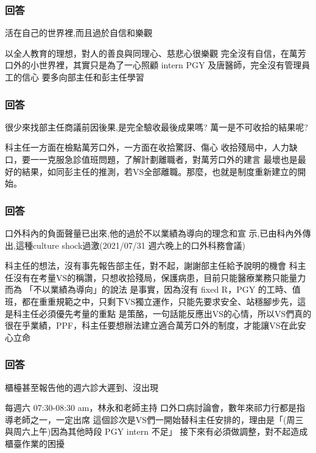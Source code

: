 \documentclass[t,24pt,aspectratio=169]{beamer}
\begin{document}



\begin{frame}[hoved]
\frametitle{回答}
活在自己的世界裡,而且過於自信和樂觀

\begin{outline}
\1 以全人教育的理想，對人的善良與同理心、慈悲心很樂觀
\1 完全沒有自信，在萬芳口外的小世界裡，其實只是為了一心照顧 intern PGY 及唐醫師，完全沒有管理員工的信心
\1 要多向部主任和彭主任學習
\end{outline}

\end{frame}

\begin{frame}[hoved]
\frametitle{回答}
很少來找部主任商議前因後果,是完全驗收最後成果嗎?
萬一是不可收拾的結果呢?
\begin{outline}
\1 科主任一方面在檢點萬芳口外，一方面在收拾驚訝、傷心
\1 收拾殘局中，人力缺口，要一一克服急診值班問題，了解計劃離職者，對萬芳口外的建言
\1 最壞也是最好的結果，如同彭主任的推測，若VS全部離職。那麼，也就是制度重新建立的開始。
\end{outline}

\end{frame}

\begin{frame}[hoved]
\frametitle{回答}
口外科內的負面聲量已出來,他的過於不以業績為導向的理念和宣
示,已由科內外傳出,這種culture shock過激(2021/07/31 週六晚上的口外科務會議) 
\begin{outline}
\1 科主任的想法，沒有事先報告部主任，對不起，謝謝部主任給予說明的機會
\1 科主任沒有在考量VS的稱讚，只想收拾殘局，保護病患，目前只能醫療業務只能量力而為
\1 「不以業績為導向」的說法
    \2 是事實，因為沒有 fixed R，PGY 的工時、值班，都在重重規範之中，只剩下VS獨立運作，只能先要求安全、站穩腳步先，這是科主任必須優先考量的重點
    \2 是策酪，一句話能反應出VS的心情，所以VS們真的很在乎業績，PPF，科主任要想辦法建立適合萬芳口外的制度，才能讓VS在此安心立命

\end{outline}

\end{frame}

\begin{frame}[hoved]
\frametitle{回答}
櫃檯甚至報告他的週六診大遲到、沒出現
\begin{outline}
\1 每週六 07:30-08:30 am，林永和老師主持 口外口病討論會，數年來祁力行都是指導老師之一，一定出席
    \2 這個診次是VS們一開始替科主任安排的，理由是「(周三與周六上午)因為其他時段 PGY intern 不足」
    \2 接下來有必須做調整，對不起造成櫃臺作業的困擾

\end{outline}


\end{frame}
\end{document}
